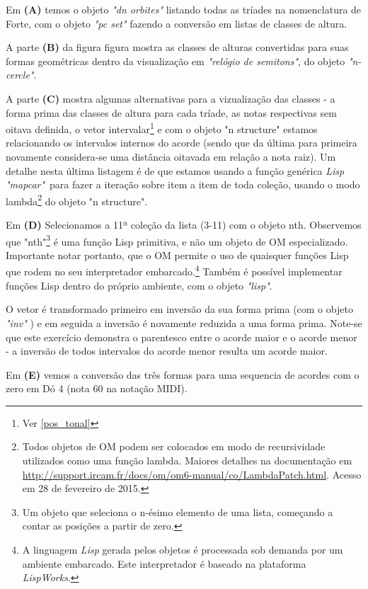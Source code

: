 \documentclass[
	12pt,				%
	openright,			%
	twoside,			%
	a4paper,			%
	english,			%
	french,				%
	spanish,			%
	brazil				%
	]{abntex2}
\begin{document}
Em \textbf{(A)} temos o objeto \textit{"dn orbites"} listando todas as tríades na nomenclatura de Forte, com o objeto \textit{"pc set"} fazendo a conversão em listas de classes de altura. 

A parte \textbf{(B)} da figura figura mostra as classes de alturas convertidas para suas formas geométricas dentro da visualização em \textit{"relógio de semitons"}, do objeto \textit{"n-cercle"}. 

A parte \textbf{(C)} mostra algumas alternativas para a vizualização das classes - a forma prima das classes de altura para cada tríade, as notas respectivas sem oitava definida, o vetor intervalar\footnote{Ver \autoref{pos_tonal}} e com o objeto "n structure" estamos relacionando os intervalos internos do acorde (sendo que da última para primeira novamente considera-se uma distância oitavada em relação a nota raiz). Um detalhe nesta última listagem é de que estamos usando a função genérica \textit{Lisp "mapcar"}\ para fazer a iteração sobre item a item de toda coleção, usando o modo lambda\footnote{Todos objetos de OM podem ser colocados em modo de recursividade utilizados como uma função lambda. Maiores detalhes na documentação em \url{http://support.ircam.fr/docs/om/om6-manual/co/LambdaPatch.html}. Acesso em 28 de fevereiro de 2015.} do objeto "n structure".

Em \textbf{(D)} Selecionamos a 11ª coleção da lista (3-11) com o objeto nth. Observemos que "nth"\footnote{Um objeto que seleciona o n-ésimo elemento de uma lista, começando a contar as posições a partir de zero.} é uma função Lisp primitiva, e não um objeto de OM especializado. Importante notar portanto, que o OM permite o uso de quaisquer funções Lisp que rodem no seu interpretador embarcado.\footnote{A linguagem \textit{Lisp} gerada pelos objetos é processada sob demanda por um ambiente embarcado. Este interpretador é baseado na plataforma \textit{LispWorks}. } Também é possível implementar funções Lisp dentro do próprio ambiente, com o objeto \textit{"lisp"}.

O vetor é transformado primeiro em inversão da sua forma prima (com o objeto \textit{"inv"} ) e em seguida a inversão é novamente reduzida a uma forma prima. Note-se que este exercício demonstra o parentesco entre o acorde maior e o acorde menor - a inversão de todos intervalos do acorde menor resulta um acorde maior.

Em \textbf{(E)} vemos a conversão das três formas para uma sequencia de acordes com o zero em Dó 4 (nota 60 na notação MIDI).
 
\end{document}
